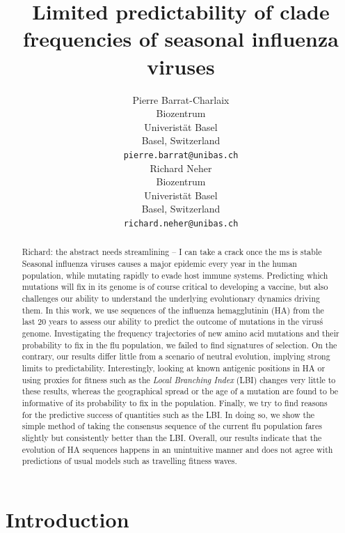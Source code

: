 \documentclass{article}
\title{Limited predictability of clade frequencies of seasonal influenza viruses}
\date{} 					%
\author{Pierre Barrat-Charlaix\\
	Biozentrum\\
	Univeristät Basel\\
	Basel, Switzerland \\
	\texttt{pierre.barrat@unibas.ch} \\
	\And
	\hspace{1mm}Richard Neher \\
	Biozentrum\\
	Univeristät Basel\\
	Basel, Switzerland \\
	\texttt{richard.neher@unibas.ch} \\
}
\newcommand{\RAN}[1]{{\color{blue}Richard: #1}}
\begin{document}
\maketitle

\begin{abstract}
    \RAN{the abstract needs streamlining -- I can take a crack once the ms is stable}
	Seasonal influenza viruses causes a major epidemic every year in the human population, while mutating rapidly to evade host immune systems. Predicting which mutations will fix in its genome is of course critical to developing a vaccine, but also challenges our ability to understand the underlying evolutionary dynamics driving them. In this work, we use sequences of the influenza hemagglutinin (HA) from the last 20 years to assess our ability to predict the outcome of mutations in the virus\'s genome. Investigating the frequency trajectories of new amino acid mutations and their probability to fix in the flu population, we failed to find signatures of selection. On the contrary, our results differ little from a scenario of neutral evolution, implying strong limits to predictability. Interestingly, looking at known antigenic positions in HA or using proxies for fitness such as the \emph{Local Branching Index} (LBI) changes very little to these results, whereas the geographical spread or the age of a mutation are found to be informative of its probability to fix in the population. Finally, we try to find reasons for the predictive success of quantities such as the LBI. In doing so, we show the simple method of taking the consensus sequence of the current flu population fares slightly but consistently better than the LBI. Overall, our results indicate that the evolution of HA sequences happens in an unintuitive manner and does not agree with predictions of usual models such as travelling fitness waves.  
\end{abstract}

\section*{Introduction} %
\label{sec:introduction}
	
\end{document}
